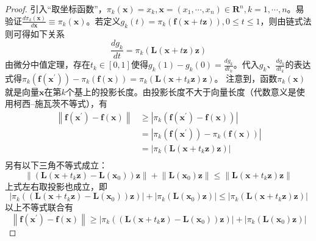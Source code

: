 \documentclass[../main.tex]{subfiles}
\begin{document}
\begin{proof}
    引入“取坐标函数”，$\pi_k\left(\mathbf{x}\right)=x_k,\mathbf{x}=\left(x_1,\cdots,x_n\right)\in\mathbf{R}^n,k=1,\cdots,n$。易验证$\frac{d\pi_k\left(\mathbf{x}\right)}{d\mathbf{x}}\equiv\pi_k\left(\mathbf{x}\right)$。若定义$g_k\left(t\right)=\pi_k\left(\mathbf{f}\left(\mathbf{x}+t\mathbf{z}\right)\right),0\leq t\leq 1$，则由链式法则可得如下关系
    \[
        \frac{dg_k}{dt}=\pi_k\left(\mathbf{L}\left(\mathbf{x}+t\mathbf{z}\right)\mathbf{z}\right)\]
    由微分中值定理，存在$t_k\in\left[0,1\right]$使得$g_k\left(1\right)-g_k\left(0\right)=\frac{dg_k}{dt_k}$。代入$g_k$、$\frac{dg_k}{dt_k}$的表达式得$\pi_k\left(\mathbf{f}\left(\mathbf{x}^\prime\right)\right)-\pi_k\left(\mathbf{f}\left(\mathbf{x}\right)\right)=\pi_k\left(\mathbf{L}\left(\mathbf{x}+t_k\mathbf{z}\right)\mathbf{z}\right)$。
    注意到，函数$\pi_k\left(\mathbf{x}\right)$就是向量$\mathbf{x}$在第$k$个基上的投影长度。由投影长度不大于向量长度（代数意义是使用柯西--施瓦茨不等式），有
    \begin{align*}
        \left\|\mathbf{f}\left(\mathbf{x}^\prime\right)-\mathbf{f}\left(\mathbf{x}\right)\right\| & \geq\left|\pi_k\left(\mathbf{f}\left(\mathbf{x}^\prime\right)-\mathbf{f}\left(\mathbf{x}\right)\right)\right|                \\
                                                                                                  & =\left|\pi_k\left(\mathbf{f}\left(\mathbf{x}^\prime\right)\right)-\pi_k\left(\mathbf{f}\left(\mathbf{x}\right)\right)\right| \\
                                                                                                  & =\left|\pi_k\left(\mathbf{L}\left(\mathbf{x}+t_k\mathbf{z}\right)\mathbf{z}\right)\right|                                    \\
    \end{align*}
    另有以下三角不等式成立：
    \[
        \left\|\left(\mathbf{L}\left(\mathbf{x}+t_k\mathbf{z}\right)-\mathbf{L}\left(\mathbf{x}_0\right)\right)\mathbf{z}\right\|+\left\|\mathbf{L}\left(\mathbf{x}_0\right)\mathbf{z}\right\|\leq\left\|\mathbf{L}\left(\mathbf{x}+t_k\mathbf{z}\right)\mathbf{z}\right\|
    \]
    上式左右取投影也成立，即
    \[\left|\pi_k\left(\left(\mathbf{L}\left(\mathbf{x}+t_k\mathbf{z}\right)-\mathbf{L}\left(\mathbf{x}_0\right)\right)\mathbf{z}\right)\right|+\left|\pi_k\left(\mathbf{L}\left(\mathbf{x}_0\right)\mathbf{z}\right)\right|\leq\left|\pi_k\left(\mathbf{L}\left(\mathbf{x}+t_k\mathbf{z}\right)\mathbf{z}\right)\right|
    \]
    以上不等式联合有
    \[
        \left\|\mathbf{f}\left(\mathbf{x}^\prime\right)-\mathbf{f}\left(\mathbf{x}\right)\right\|\geq\left|\pi_k\left(\left(\mathbf{L}\left(\mathbf{x}+t_k\mathbf{z}\right)-\mathbf{L}\left(\mathbf{x}_0\right)\right)\mathbf{z}\right)\right|+\left|\pi_k\left(\mathbf{L}\left(\mathbf{x}_0\right)\mathbf{z}\right)\right|
\]
\end{proof}
\end{document}
